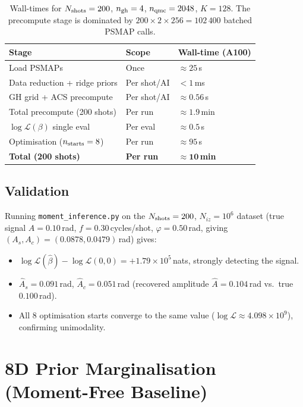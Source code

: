 \documentclass[11pt,a4paper]{article}
\begin{document}
\begin{table}[h]
\centering
\begin{tabular}{lll}
\toprule
Stage & Scope & Wall-time (A100) \\
\midrule
Load PSMAPs                       & Once               & ${\approx}25$\,s \\
Data reduction + ridge priors     & Per shot/AI        & ${<}1$\,ms \\
GH grid + ACS precompute          & Per shot/AI        & ${\approx}0.56$\,s \\
Total precompute (200 shots)      & Per run            & ${\approx}1.9$\,min \\
$\log\mathcal{L}(\beta)$ single eval & Per eval        & ${\approx}0.5$\,s \\
Optimisation ($n_{\rm starts}=8$) & Per run           & ${\approx}95$\,s \\
\textbf{Total (200 shots)}        & \textbf{Per run}  & $\mathbf{{\approx}10}$\,\textbf{min} \\
\bottomrule
\end{tabular}
\caption{Wall-times for $N_{\rm shots}=200$, $n_{\rm gh}=4$, $n_{\rm qmc}=2048$, $K=128$.
The precompute stage is dominated by $200\times2\times256=102\,400$ batched PSMAP calls.}
\label{tab:gh_cost}
\end{table}

\subsection{Validation}
\label{sec:gh_validation}

Running \texttt{moment\_inference.py} on the $N_{\rm shots}=200$, $N_{iz}=10^6$
dataset (true signal $A=0.10$\,rad, $f=0.30$\,cycles/shot, $\varphi=0.50$\,rad,
giving $(A_s,A_c)=(0.0878,0.0479)$\,rad) gives:
\begin{itemize}
  \item $\log\mathcal{L}(\hat\beta)-\log\mathcal{L}(0,0)=+1.79\times10^5$\,nats,
    strongly detecting the signal.
  \item $\hat A_s=0.091$\,rad, $\hat A_c=0.051$\,rad
    (recovered amplitude $\hat A=0.104$\,rad vs.\ true $0.100$\,rad).
  \item All 8 optimisation starts converge to the same value
    ($\log\mathcal{L}\approx4.098\times10^9$), confirming unimodality.
\end{itemize}

\section{8D Prior Marginalisation (Moment-Free Baseline)}
\label{sec:prior8d}
\end{document}
